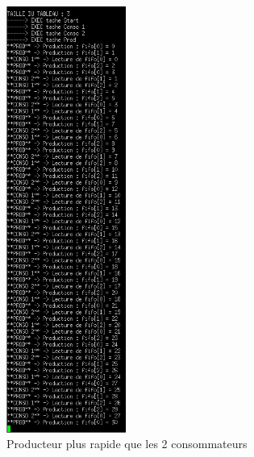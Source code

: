 \documentclass[a4paper,12pt]{report}
\begin{document}
\newpage

\begin{figure}[h]
	\centering
		\includegraphics[width=0.35\textwidth]{screens/prod_plus_rapide_sem_2conso_meme_vitesse_1prod.png}
		\caption{Producteur plus rapide que les 2 consommateurs}
		\label{prod_plus_rapide_sem_2conso_meme_vitesse_1prod}
\end{figure}

\newpage
\end{document}
